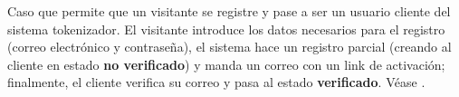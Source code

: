 %
%

{
  Caso que permite que un visitante se registre y pase a ser
  un usuario cliente del sistema tokenizador. El visitante introduce los datos
  necesarios para el registro (correo electrónico y contraseña), el sistema
  hace un registro parcial (creando al cliente en estado \textbf{no verificado})
  y manda un correo con un link de activación; finalmente, el cliente verifica
  su correo y pasa al estado \textbf{verificado}. Véase
  .
}
